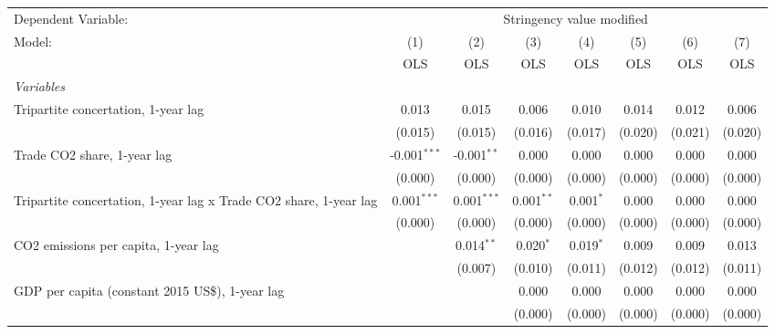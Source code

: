 
\begingroup
\centering
\begin{tabular}{lccccccc}
   \toprule
   Dependent Variable: & \multicolumn{7}{c}{Stringency value modified}\\
   Model:                                                            & (1)            & (2)           & (3)          & (4)         & (5)     & (6)     & (7)\\  
                                                                     &  OLS           & OLS           & OLS          & OLS         & OLS     & OLS     & OLS\\  
   \midrule
   \emph{Variables}\\
   Tripartite concertation, 1-year lag                               & 0.013          & 0.015         & 0.006        & 0.010       & 0.014   & 0.012   & 0.006\\   
                                                                     & (0.015)        & (0.015)       & (0.016)      & (0.017)     & (0.020) & (0.021) & (0.020)\\   
   Trade CO2 share, 1-year lag                                       & -0.001$^{***}$ & -0.001$^{**}$ & 0.000        & 0.000       & 0.000   & 0.000   & 0.000\\   
                                                                     & (0.000)        & (0.000)       & (0.000)      & (0.000)     & (0.000) & (0.000) & (0.000)\\   
   Tripartite concertation, 1-year lag x Trade CO2 share, 1-year lag & 0.001$^{***}$  & 0.001$^{***}$ & 0.001$^{**}$ & 0.001$^{*}$ & 0.000   & 0.000   & 0.000\\   
                                                                     & (0.000)        & (0.000)       & (0.000)      & (0.000)     & (0.000) & (0.000) & (0.000)\\   
   CO2 emissions per capita, 1-year lag                              &                & 0.014$^{**}$  & 0.020$^{*}$  & 0.019$^{*}$ & 0.009   & 0.009   & 0.013\\   
                                                                     &                & (0.007)       & (0.010)      & (0.011)     & (0.012) & (0.012) & (0.011)\\   
   GDP per capita (constant 2015 US\$), 1-year lag                   &                &               & 0.000        & 0.000       & 0.000   & 0.000   & 0.000\\   
                                                                     &                &               & (0.000)      & (0.000)     & (0.000) & (0.000) & (0.000)\\   

\end{tabular}
